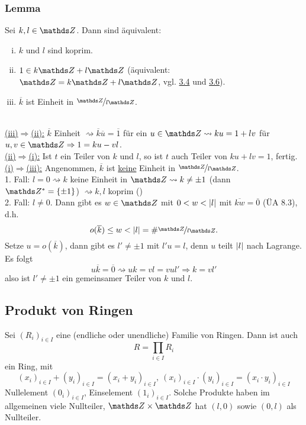 \subsubsection*{Lemma}
Sei $k,l\in\Z$. 
Dann sind äquivalent:
\begin{enumerate}[(i)]
	\item $k$ und $l$ sind koprim.
	\item $1\in k\Z+l\Z$ (äquivalent: $\Z=k\Z+l\Z$, vgl. \hyperref[sub:homomor_ideale]{3.4} und \hyperref[sub:rechnen_ideale]{3.6}).
	\item $\overline{k}$ ist Einheit in $\nicefrac{\Z}{l\Z}$.
\end{enumerate}

\\
\uline{(iii)$\Rightarrow$(ii):}
$\overline{k}$ Einheit $\rightsquigarrow \overline{k}\overline{u}=\overline{1}$ für ein $u\in \Z \rightsquigarrow ku=1+lv$ für $u,v\in \Z \Rightarrow 1=ku-vl$.\\

\uline{(ii)$\Rightarrow$(i):}
Ist $t$ ein Teiler von $k$ und $l$, so ist $t$ auch Teiler von $ku+lv=1$, fertig.\\

\uline{(i)$\Rightarrow$(iii):}
Angenommen, $\overline{k}$ ist \uline{keine} Einheit in $\nicefrac{\Z}{l\Z}$.\\
1. Fall: $l=0\rightsquigarrow k$ keine Einheit in $\Z\rightsquigarrow k\neq \pm 1$ (dann $\Z^*=\{\pm1\}$) $\rightsquigarrow k,l$ koprim (\checkmark)\\
2. Fall: $l\neq 0$.
Dann gibt es $w\in \Z$ mit $0<w<\left\vert l\right\vert$ mit $\overline{kw}=\overline{0}$ (ÜA 8.3), d.h.
\[
o(\overline{k})\le w<\abs{l}=\#\nicefrac{\Z}{l\Z}.
\]
Setze $u=o(\overline{k})$, dann gibt es $l'\neq \pm 1$ mit $l'u=l$, denn $u$ teilt $\left\vert l\right\vert$ nach Lagrange.\\
Es folgt
\[
u\overline{k}=\overline{0}\rightsquigarrow uk=vl=vul'\Rightarrow k=vl'
\]
also ist $l'\neq \pm 1$ ein gemeinsamer Teiler von $k$ und $l$.

\subsection{Produkt von Ringen}
\label{sub:produkt_ringe}
Sei $(R_i)_{i\in I}$ eine (endliche oder unendliche) Familie von Ringen.
Dann ist auch
\[
R=\prod_{i\in I}R_i
\]
ein Ring, mit 
\[
(x_i)_{i\in I}+(y_i)_{i\in I}=(x_i+y_i)_{i\in I},~(x_i)_{i\in I}\cdot (y_i)_{i\in I}=(x_i\cdot y_i)_{i\in I}
\]
Nullelement $(0_i)_{i\in I}$, Einselement $(1_i)_{i\in I}$.
Solche Produkte haben im allgemeinen viele Nullteiler, $\Z\times \Z$ hat $(l,0)$ sowie $(0,l)$ als Nullteiler.

